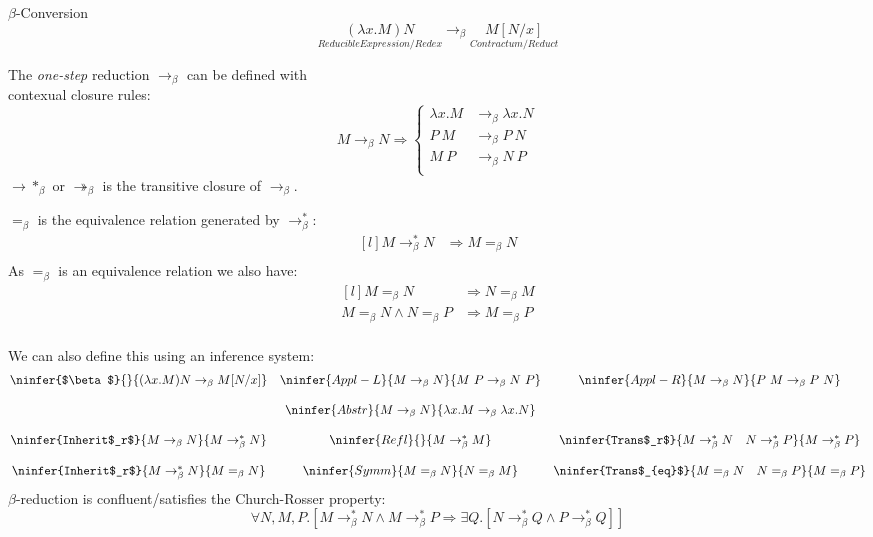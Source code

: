 \begin{definitionbox}{$\beta$-Conversion}
	\[\underset{Reducible Expression/Redex}{(\lambda x . M) N} \to_\beta \underset{Contractum/Reduct}{M[N / x]}\]
	\begin{minipage}{.5\textwidth}
		The \textit{one-step} reduction $\to_\beta$ can be defined with
		\\ contexual closure rules:
		\[M \to_\beta N \Rightarrow \begin{cases}
				\lambda x. M & \to_\beta \lambda x . N \\
				P \ M        & \to_\beta P \ N         \\
				M \ P        & \to_\beta N \ P         \\
			\end{cases}\]
		$\to*_\beta$ or $\twoheadrightarrow_\beta$ is the transitive closure of $\to_\beta$.
	\end{minipage}
	\begin{minipage}{.5\textwidth}
		$=_\beta$ is the equivalence relation generated by $\to^*_\beta$:
		\[\begin{matrix*}[l]
				M \to^*_\beta N & \Rightarrow M =_\beta N \\
			\end{matrix*}\]
		As $=_\beta$ is an equivalence relation we also have:
		\[\begin{matrix*}[l]
				M =_\beta N & \Rightarrow N =_\beta M \\
				M =_\beta N \land N =_\beta P & \Rightarrow M =_\beta P \\
			\end{matrix*}\]
	\end{minipage}
	We can also define this using an inference system:
	\[\begin{matrix}
			\ninfer{$\beta$}{}{(\lambda x . M) N \to_\beta M [N / x]}
			 & \ninfer{Appl-L}{M \to_\beta N}{M \ P \to_\beta N \ P}
			 & \ninfer{Appl-R}{M \to_\beta N}{P \ M \to_\beta P \ N}                      \\
			\\
			 & \ninfer{Abstr}{M \to_\beta N}{\lambda x . M \to_\beta \lambda x . N}       \\
			\\
			\ninfer{Inherit$_r$}{M \to_\beta N}{M \to^*_\beta N}
			 & \ninfer{Refl}{}{M \to^*_\beta M}
			 & \ninfer{Trans$_r$}{M \to^*_\beta N \quad N \to^*_\beta P}{M \to^*_\beta P} \\
			\\
			\ninfer{Inherit$_r$}{M \to^*_\beta N}{M =_\beta N}
			 & \ninfer{Symm}{M =_\beta N}{N =_\beta M}
			 & \ninfer{Trans$_{eq}$}{M =_\beta N \quad N =_\beta P}{M =_\beta P}          \\
		\end{matrix}\]
	$\beta$-reduction is confluent/satisfies the Church-Rosser property:
	\[\forall N, M, P . [M \to^*_\beta N \land M \to^*_\beta P \Rightarrow \exists Q . [N \to^*_\beta Q \land P \to^*_\beta Q] ] \]
\end{definitionbox}
